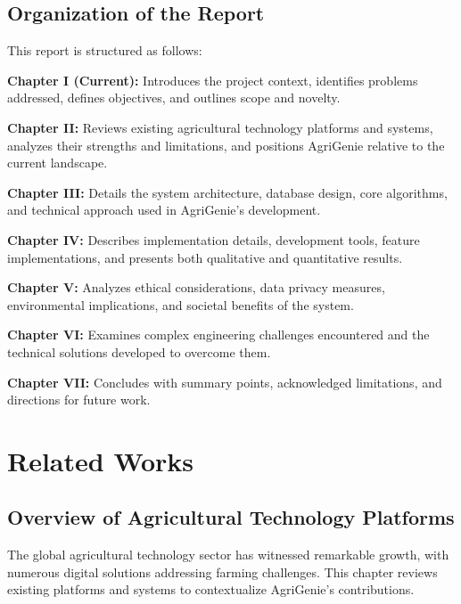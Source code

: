 \documentclass[12pt,a4paper]{report}
\begin{document}
\section{Organization of the Report}

This report is structured as follows:

\textbf{Chapter I (Current):} Introduces the project context, identifies problems addressed, defines objectives, and outlines scope and novelty.

\textbf{Chapter II:} Reviews existing agricultural technology platforms and systems, analyzes their strengths and limitations, and positions AgriGenie relative to the current landscape.

\textbf{Chapter III:} Details the system architecture, database design, core algorithms, and technical approach used in AgriGenie's development.

\textbf{Chapter IV:} Describes implementation details, development tools, feature implementations, and presents both qualitative and quantitative results.

\textbf{Chapter V:} Analyzes ethical considerations, data privacy measures, environmental implications, and societal benefits of the system.

\textbf{Chapter VI:} Examines complex engineering challenges encountered and the technical solutions developed to overcome them.

\textbf{Chapter VII:} Concludes with summary points, acknowledged limitations, and directions for future work.

\newpage

\chapter{Related Works}

\section{Overview of Agricultural Technology Platforms}

The global agricultural technology sector has witnessed remarkable growth, with numerous digital solutions addressing farming challenges. This chapter reviews existing platforms and systems to contextualize AgriGenie's contributions.
\end{document}
